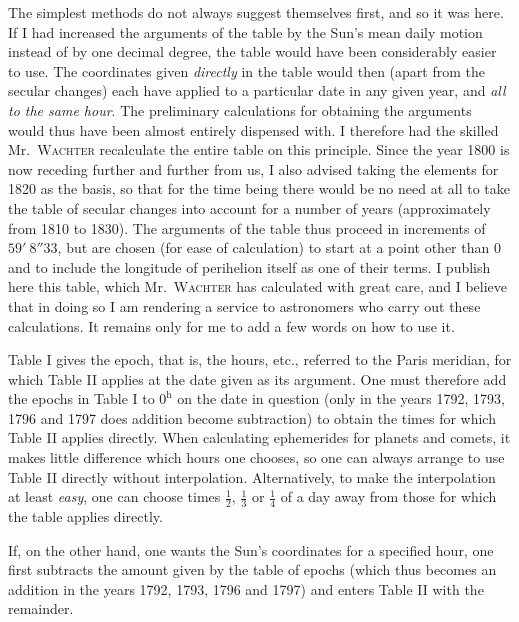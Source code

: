 The simplest methods do not always suggest themselves first, and so it was here. If I had increased the arguments of the table by the Sun’s mean daily motion instead of by one decimal degree, the table would have been considerably easier to use. The coordinates given \emph{directly} in the table would then (apart from the secular changes) each have applied to a particular date in any given year, and \emph{all to the same hour}. The preliminary calculations for obtaining the arguments would thus have been almost entirely dispensed with. I therefore had the skilled Mr.\ \textsc{Wachter} recalculate the entire table on this principle. Since the year 1800 is now receding further and further from us, I also advised taking the elements for 1820 as the basis, so that for the time being there would be no need at all to take the table of secular changes into account for a number of years (approximately from 1810 to 1830). The arguments of the table thus proceed in increments of $59'\ 8''33$, but are chosen (for ease of calculation) to start at a point other than 0 and to include the longitude of perihelion itself as one of their terms. I publish here this table, which Mr.\ \textsc{Wachter} has calculated with great care, and I believe that in doing so I am rendering a service to astronomers who carry out these calculations. It remains only for me to add a few words on how to use it.
%

Table I gives the epoch, that is, the hours, etc., referred to the Paris meridian, for which Table II applies at the date given as its argument. One must therefore add the epochs in Table I to $0^{\mathrm h}$ on the date in question (only in the years 1792, 1793, 1796 and 1797 does addition become subtraction) to obtain the times for which Table II applies directly. When calculating ephemerides for planets and comets, it makes little difference which hours one chooses, so one can always arrange to use Table II directly without interpolation. Alternatively, to make the interpolation at least \emph{easy}, one can choose times $\frac12$, $\frac13$ or $\frac14$ of a day away from those for which the table applies directly.

If, on the other hand, one wants the Sun’s coordinates for a specified hour, one first subtracts the amount given by the table of epochs (which thus becomes an addition in the years 1792, 1793, 1796 and 1797) and enters Table II with the remainder.

